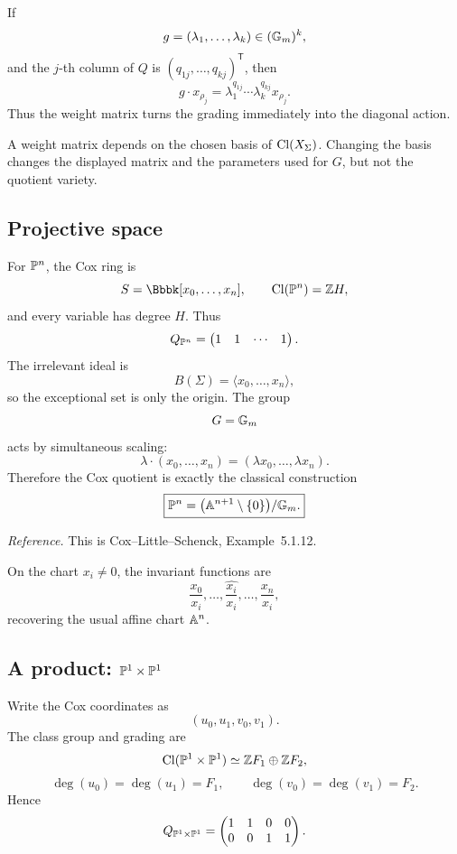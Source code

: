 If
\[
g=(\lambda_1,\dots,\lambda_k)\in(\mathbb{G}_{m})^k,
\]
and the \(j\)-th column of \(Q\) is
\((q_{1j},\dots,q_{kj})^\mathsf{T}\), then
\[
g\cdot x_{\rho_j}
=
\lambda_1^{q_{1j}}\cdots\lambda_k^{q_{kj}}x_{\rho_j}.
\]
Thus the weight matrix turns the grading immediately into the diagonal
action.

\begin{warningbox}
A weight matrix depends on the chosen basis of \(\operatorname{Cl}(X_\Sigma)\).
Changing the basis changes the displayed matrix and the parameters
used for \(G\), but not the quotient variety.
\end{warningbox}

\subsection{Projective space}

For \(\mathbb{P}^n\), the Cox ring is
\[
S=\Bbbk[x_0,\dots,x_n],
\qquad
\Cl(\PP^n)=\ZZ H,
\]
and every variable has degree \(H\). Thus
\[
Q_{\mathbb{P}^n}
=
\begin{pmatrix}
1&1&\cdots&1
\end{pmatrix}.
\]
The irrelevant ideal is
\[
B(\Sigma)=\langle x_0,\dots,x_n\rangle,
\]
so the exceptional set is only the origin. The group
\[
G=\mathbb{G}_{m}
\]
acts by simultaneous scaling:
\[
\lambda\cdot(x_0,\dots,x_n)
=
(\lambda x_0,\dots,\lambda x_n).
\]
Therefore the Cox quotient is exactly the classical construction
\[
\boxed{
\mathbb{P}^n
=
\bigl(\mathbb{A}^{n+1}\setminus\{0\}\bigr)/\mathbb{G}_{m}.
}
\]

\noindent
\textit{Reference.}
This is Cox--Little--Schenck, Example~5.1.12.

On the chart \(x_i\neq0\), the invariant functions are
\[
\frac{x_0}{x_i},\dots,
\widehat{\frac{x_i}{x_i}},\dots,
\frac{x_n}{x_i},
\]
recovering the usual affine chart \(\mathbb{A}^n\).

\subsection{A product: \texorpdfstring{\(\mathbb{P}^1\times\mathbb{P}^1\)}{P1 x P1}}

Write the Cox coordinates as
\[
(u_0,u_1,v_0,v_1).
\]
The class group and grading are
\[
\operatorname{Cl}(\mathbb{P}^1\times\mathbb{P}^1)
\simeq
\mathbb{Z} F_1\oplus\mathbb{Z} F_2,
\]
\[
\deg(u_0)=\deg(u_1)=F_1,
\qquad
\deg(v_0)=\deg(v_1)=F_2.
\]
Hence
\[
Q_{\mathbb{P}^1\times\mathbb{P}^1}
=
\begin{pmatrix}
1&1&0&0\\
0&0&1&1
\end{pmatrix}.
\]

